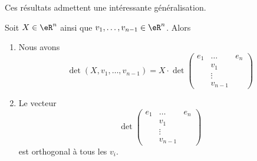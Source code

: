 Ces résultats admettent une intéressante généralisation.
\begin{lemma}       \label{LEMooFRWKooVloCSM}
    Soit \( X\in \eR^n\) ainsi que \( v_1,\ldots, v_{n-1}\in \eR^n\). Alors
    \begin{enumerate}
        \item
            Nous avons
            \begin{equation}        \label{EQooMQNPooRHHBjz}
                \det(X,v_1,\ldots, v_{n-1})=X\cdot
                \det\begin{pmatrix}
                  e_1   &   \ldots    &   e_n     \\
                        &   v_1       &           \\
                        &   \vdots    &           \\
                        &   v_{n-1}   &
                 \end{pmatrix}
            \end{equation}
        \item
            Le vecteur
            \begin{equation}
                \det\begin{pmatrix}
                  e_1   &   \ldots    &   e_n     \\
                        &   v_1       &           \\
                        &   \vdots    &           \\
                        &   v_{n-1}   &
                 \end{pmatrix}
            \end{equation}
            est orthogonal à tous les \( v_i\).
    \end{enumerate}
\end{lemma}

